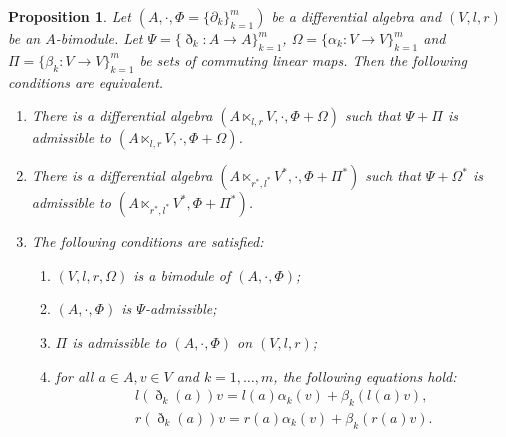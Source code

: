 \documentclass[10pt,a4paper]{amsart}
\numberwithin{equation}{section}
\newtheorem{Proposition}[Theorem]{Proposition}
{ \theoremstyle{definition}
	\newtheorem{Definition}[Theorem]{Definition}
	\newtheorem{Note}[Theorem]{Note}
	\newtheorem{Example}[Theorem]{Example}
	\newtheorem{Remark}[Theorem]{Remark} }
\begin{document}
\begin{Proposition}\label{pro:admsemi}
 Let $(A, \cdot, \Phi = \{\partial_k\}_{k=1}^m)$ be a differential algebra and
 $(V, l, r)$ be an $A$-bimodule.
 Let $\Psi = \{\eth_k\colon A \to A \}_{k=1}^m$, $\Omega = \{\alpha_k\colon V \to V\}_{k=1}^m$ and
 $\Pi = \{\beta_k\colon V \to V\}_{k=1}^m$ be sets of commuting linear maps.
 Then the following conditions are equivalent.
 \begin{enumerate}\itemsep=0pt
 \item[$1.$] There is a differential algebra $(A \ltimes_{l,r} V, \cdot, \Phi + \Omega)$ such that $\Psi + \Pi$ is admissible to $(A \ltimes_{l,r} V, \cdot, \Phi + \Omega)$.

 \item[$2.$] There is a differential algebra $(A \ltimes_{r^*, l^*} V^*, \cdot, \Phi + \Pi^*)$ such that $\Psi + \Omega^*$ is admissible to $(A \ltimes_{r^*,l^*} V^*, \Phi + \Pi^*)$.

 \item[$3.$] The following conditions are satisfied:
 \begin{enumerate}\itemsep=0pt
 \item[$(i)$] $(V, l, r, \Omega)$ is a bimodule of $(A, \cdot, \Phi)$;
 \item[$(ii)$] $(A, \cdot, \Phi)$ is $\Psi$-admissible;
 \item[$(iii)$] $\Pi$ is admissible to $(A, \cdot, \Phi)$ on $(V, l, r)$;
 \item[$(iv)$] for all $a \in A, v \in V$ and $k=1, \dots, m$, the following equations hold:
 \begin{gather}
 l(\eth_k(a))v = l(a) \alpha_k(v) + \beta_k( l(a)v ), \label{eq:admsemi1} \\
 r(\eth_k(a))v = r(a) \alpha_k(v) + \beta_k( r(a)v ). \label{eq:admsemi2}
 \end{gather}
 \end{enumerate}
 \end{enumerate}
\end{Proposition}
\end{document}
